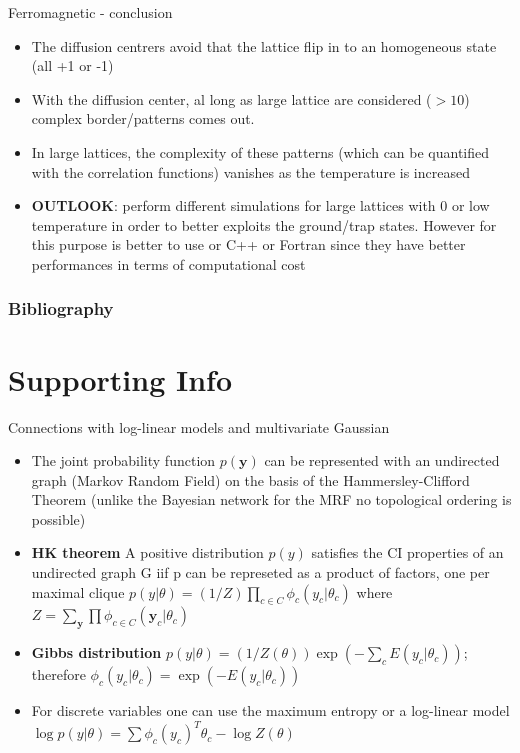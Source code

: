 \documentclass{beamer}
\begin{document}
\begin{frame}{Ferromagnetic - conclusion}
\begin{itemize}
\item The diffusion centrers avoid that the lattice flip in to an homogeneous state (all +1 or -1) 
\item With the diffusion center, al long as large lattice are considered ($>10$) complex border/patterns comes out. 
\item In large lattices, the complexity of these patterns (which can be quantified with the correlation functions) vanishes as the temperature is increased 
\item \textbf{OUTLOOK}: perform different simulations for large lattices with 0 or low temperature in order to better exploits the ground/trap states. However for this purpose is better to use or C++ or Fortran since they have better performances in terms of computational cost 
\end{itemize}

\end{frame}



\begin{frame}[t,allowframebreaks]
\frametitle{Bibliography}
\printbibliography
\end{frame}



\section{Supporting Info}





\begin{frame}{Connections with log-linear models and multivariate Gaussian   \cite{murphy2012machine}}
\begin{itemize}
\item The joint probability function $p(\textbf{y})$ can be represented with an undirected graph (Markov Random Field) on the basis of the Hammersley-Clifford Theorem (unlike the Bayesian network for the MRF no topological ordering is possible) 
\item \textbf{HK theorem }A positive distribution $p(y)$ satisfies the CI properties of an undirected graph G iif p can be represeted as a product of factors, one per maximal clique $p(y|\theta)=(1/Z)\prod_{c\in C} \phi_{c}(y_{c}|\theta_{c})$ where $Z=\sum_{\textbf{y}}\prod\phi_{c\in C}(\textbf{y}_{c}|\theta_{c})$
\item \textbf{Gibbs distribution} $p(y|\theta)=(1/Z(\theta))\exp\left(-\sum_{c}E(y_{c}|\theta_{c})\right)$; therefore $\phi_{c}(y_{c}|\theta_{c})=\exp(-E(y_{c}|\theta_{c}))$
\item For discrete variables one can use the maximum entropy or a log-linear model $\log p(y|\theta)=\sum\phi_{c}(y_{c})^{T}\theta_{c}-\log Z(\theta)$

\end{itemize}
\end{frame}
\end{document}
